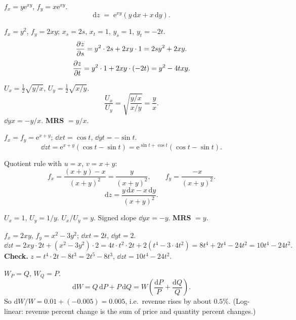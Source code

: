 \begin{solutions}
  \item $f_{x}=y\mathrm{e}^{xy}$, $f_{y}=x\mathrm{e}^{xy}$.
        \[
          \mathrm{d}z \;=\; \mathrm{e}^{xy}(y\,\mathrm{d}x+x\,\mathrm{d}y) .
        \]

  \item $f_{x}=y^{2}$, $f_{y}=2xy$; $x_{s}=2s$, $x_{t}=1$, $y_{s}=1$,
        $y_{t}=-2t$.
        \[
          \frac{\partial z}{\partial s}=y^{2}\cdot 2s+2xy\cdot 1=2sy^{2}+2xy .
        \]
        \[
          \frac{\partial z}{\partial t}=y^{2}\cdot 1+2xy\cdot(-2t)=y^{2}-4txy .
        \]

  \item $U_{x}=\tfrac{1}{2}\sqrt{y/x}$, $U_{y}=\tfrac{1}{2}\sqrt{x/y}$.
        \[
          \frac{U_{x}}{U_{y}}=\sqrt{\frac{y/x}{x/y}}=\frac{y}{x} .
        \]
        $\dd{y}{x}=-y/x$. \textbf{MRS} $=y/x$.

  \item $f_{x}=f_{y}=\mathrm{e}^{x+y}$; $\dd{x}{t}=\cos t$,
        $\dd{y}{t}=-\sin t$.
        \[
          \dd{z}{t}=\mathrm{e}^{x+y}(\cos t-\sin t)
            =\mathrm{e}^{\sin t+\cos t}(\cos t-\sin t) .
        \]

  \item Quotient rule with $u=x$, $v=x+y$:
        \[
          f_{x}=\frac{(x+y)-x}{(x+y)^{2}}=\frac{y}{(x+y)^{2}},\qquad
          f_{y}=\frac{-x}{(x+y)^{2}} .
        \]
        \[
          \mathrm{d}z=\frac{y\,\mathrm{d}x-x\,\mathrm{d}y}{(x+y)^{2}} .
        \]

  \item $U_{x}=1$, $U_{y}=1/y$. $U_{x}/U_{y}=y$. Signed slope
        $\dd{y}{x}=-y$. \textbf{MRS} $=y$.

  \item $f_{x}=2xy$, $f_{y}=x^{2}-3y^{2}$; $\dd{x}{t}=2t$,
        $\dd{y}{t}=2$.
        \[
          \dd{z}{t}=2xy\cdot 2t+(x^{2}-3y^{2})\cdot 2
            =4t\cdot t^{2}\cdot 2t+2(t^{4}-3\cdot 4t^{2})
            =8t^{4}+2t^{4}-24t^{2}=10t^{4}-24t^{2} .
        \]
        \textbf{Check.} $z=t^{4}\cdot 2t-8t^{3}=2t^{5}-8t^{3}$,
        $\dd{z}{t}=10t^{4}-24t^{2}$. \checkmark

  \item $W_{P}=Q$, $W_{Q}=P$.
        \[
          \mathrm{d}W=Q\,\mathrm{d}P+P\,\mathrm{d}Q
            =W\!\left(\frac{\mathrm{d}P}{P}+\frac{\mathrm{d}Q}{Q}\right) .
        \]
        So $\mathrm{d}W/W=0.01+(-0.005)=0.005$, i.e.\ revenue rises by
        about $0.5\%$. (Log-linear: revenue percent change is the sum of
        price and quantity percent changes.)


\end{solutions}
